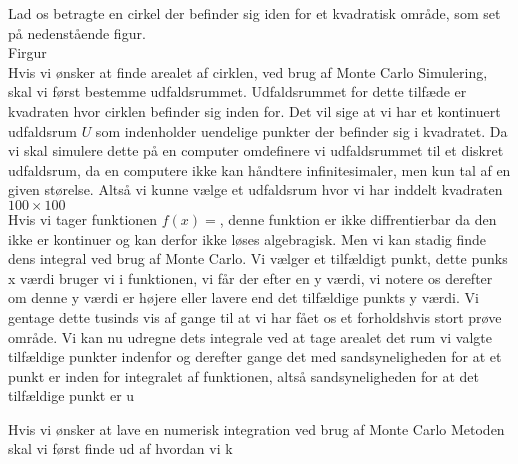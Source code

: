 \documentclass[../../SRP.tex]{subfiles}
\begin{document}
Lad os betragte en cirkel der befinder sig iden for et kvadratisk område, som set på nedenstående figur. \\

Firgur \\

Hvis vi ønsker at finde arealet af cirklen, ved brug af Monte Carlo Simulering, skal vi først bestemme udfaldsrummet. Udfaldsrummet for dette tilfæde er kvadraten hvor cirklen befinder sig inden for. Det vil sige at vi har et kontinuert udfaldsrum $U$ som indenholder uendelige punkter der befinder sig i kvadratet. Da vi skal simulere dette på en computer omdefinere vi udfaldsrummet til et diskret udfaldsrum, da en computere ikke kan håndtere infinitesimaler, men kun tal af en given størelse. Altså vi kunne vælge et udfaldsrum hvor vi har inddelt kvadraten $100 \times 100$ \\



Hvis vi tager funktionen $f(x)=$, denne funktion er ikke diffrentierbar da den ikke er kontinuer og kan derfor ikke løses algebragisk. Men vi kan stadig finde dens integral ved brug af Monte Carlo. Vi vælger et tilfældigt punkt, dette punks x værdi bruger vi i funktionen, vi får der efter en y værdi, vi notere os derefter om denne y værdi er højere eller lavere end det tilfældige punkts y værdi. Vi gentage dette tusinds vis af gange til at vi har fået os et forholdshvis stort prøve område. Vi kan nu udregne dets integrale ved at tage arealet det rum vi valgte tilfældige punkter indenfor og derefter gange det med sandsyneligheden for at et punkt er inden for integralet af funktionen, altså sandsyneligheden for at det tilfældige punkt er u

Hvis vi ønsker at lave en numerisk integration ved brug af Monte Carlo Metoden skal vi først finde ud af hvordan vi k
\end{document}
